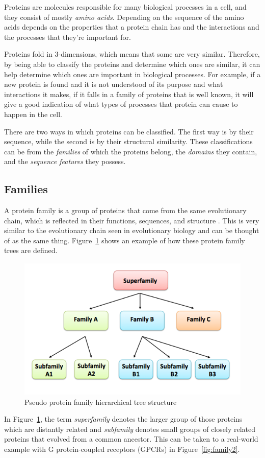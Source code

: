 \documentclass{article}
\begin{document}
Proteins are molecules responsible for many biological processes in a cell, and they consist of mostly {\em amino acids}. Depending on the sequence of the amino acids depends on the properties that a protein chain has and the interactions and the processes that they're important for.

Proteins fold in 3-dimensions, which means that some are very similar. Therefore, by being able to classify the proteins and determine which ones are similar, it can help determine which ones are important in biological processes. For example, if a new protein is found and it is not understood of its purpose and what interactions it makes, if it falls in a family of proteins that is well known, it will give a good indication of what types of processes that protein can cause to happen in the cell.

There are two ways in which proteins can be classified. The first way is by their sequence, while the second is by their structural similarity. These classifications can be from the {\em families} of which the proteins belong, the {\em domains} they contain, and the {\em sequence features} they possess. 

\subsection*{Families}

A protein family is a group of proteins that come from the same evolutionary chain, which is reflected in their functions, sequences, and structure \cite{EBI}. This is very similar to the evolutionary chain seen in evolutionary biology and can be thought of as the same thing. Figure~\ref{fig:family1} shows an example of how these protein family trees are defined.

\begin{figure}[!h]
\centering
\includegraphics[width=.5\textwidth]{family1.png}
\caption{Pseudo protein family hierarchical tree structure \cite{EBI}}
\label{fig:family1}
\end{figure}

In Figure~\ref{fig:family1}, the term {\em superfamily} denotes the larger group of those proteins which are distantly related and {\em subfamily} denotes small groups of closely related proteins that evolved from a common ancestor. This can be taken to a real-world example with G protein-coupled receptors (GPCRs) in Figure~\ref{fig:family2}.
\end{document}
